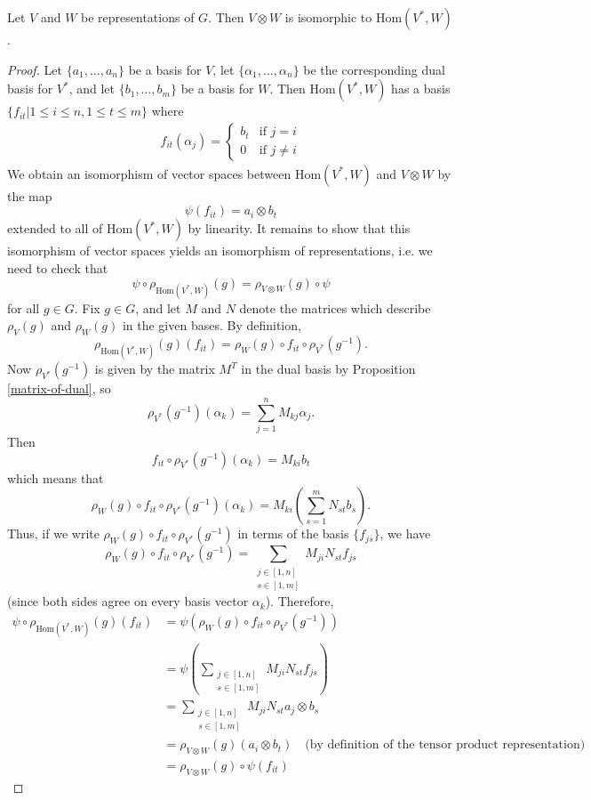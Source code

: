 \begin{prop}
Let $V$ and $W$ be representations of $G$.  Then $V \otimes W$ is isomorphic to $\text{Hom}(V^{*},W)$.
\end{prop}
\begin{proof}
Let $\{ a_1,  \ldots, a_n\}$ be a basis for $V$, let $\{\alpha_1, \ldots, \alpha_n \}$ be the corresponding dual basis for $V^{*}$, and let $\{b_1,  \ldots,b_m\}$ be a basis for $W$.  Then $\text{Hom}(V^*,W)$ has a basis $\{ f_{it} | 1 \leq i \leq n, 1 \leq t \leq m \}$ where
\begin{align*}
f_{it} (\alpha_j) = \begin{cases} b_t &\text{if } j = i\\ 0 &\text{if } j \neq i \end{cases}
\end{align*}
We obtain an isomorphism of vector spaces between $\text{Hom}(V^*,W)$ and $V \otimes W$ by the map
\[ \psi (f_{it}) = a_i \otimes b_t \]
extended to all of  $\text{Hom}(V^*,W)$ by linearity.  It remains to show that this isomorphism of vector spaces yields an isomorphism of representations, i.e. we need to check that 
\[ \psi \circ \rho_{\text{Hom}(V^*,W)} (g) = \rho_{V \otimes W} (g) \circ \psi \]
for all $g \in G$.  Fix $g \in G$, and let $M$ and $N$ denote the matrices which describe $\rho_V (g)$ and $\rho_W (g)$ in the given bases.  
By definition,
\[ \rho_{\text{Hom}(V^{*},W)} (g) (f_{it}) = \rho_W (g) \circ f_{it} \circ \rho_{V^{*}}(g^{-1}). \]
Now $\rho_{V^{*}} (g^ {-1})$ is given by the matrix $M^T$ in the dual basis by Proposition \ref{matrix-of-dual}, so
\[\rho_{V^{*}} (g^ {-1}) ( \alpha_k )= \sum_{j=1}^n M_{kj} \alpha_{j}. \]
Then
\[ f_{it} \circ \rho_{V^{*}} (g^ {-1}) (\alpha_k) = M_{ki} b_t \]
which means that 
\[ \rho_W (g) \circ f_{it} \circ \rho_{V^{*}} (g^ {-1}) ( \alpha_k) = M_{ki} \left( \sum_{s=1}^m N_{st} b_s \right). \]
Thus, if we write $\rho_W (g) \circ f_{it} \circ \rho_{V^{*}} (g^ {-1})$ in terms of the basis $\{ f_{js} \}$, we have 
\[\rho_W (g) \circ f_{it} \circ \rho_{V^{*}} (g^ {-1}) = \sum_{\substack{j \in [1,n] \\  s \in [1,m]}} M_{ji} N_{st} f_{js} \]
(since both sides agree on every basis vector $\alpha_k$).  Therefore,
\begin{align*}
\psi \circ \rho_{\text{Hom}(V^*,W)} (g) (f_{it}) &= \psi \left(\rho_W (g) \circ f_{it} \circ \rho_{V^{*}} (g^ {-1}) \right) \\
&= \psi \left(\sum_{\substack{j \in [1,n] \\  s \in [1,m]}} M_{ji} N_{st} f_{js} \right) \\
&=  \sum_{\substack{j \in [1,n] \\  s \in [1,m]}} M_{ji} N_{st} a_j \otimes b_s \\
&= \rho_{V \otimes W} (g) (a_i \otimes b_t) \quad \text{(by definition of the tensor product representation)} \\
&= \rho_{V \otimes W} (g) \circ \psi (f_{it})
\end{align*}
\end{proof}


